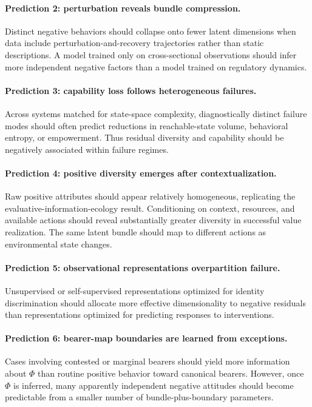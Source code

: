 \documentclass[11pt]{article}
\begin{document}
\paragraph{Prediction 2: perturbation reveals bundle compression.}
Distinct negative behaviors should collapse onto fewer latent dimensions when data include perturbation-and-recovery trajectories rather than static descriptions. A model trained only on cross-sectional observations should infer more independent negative factors than a model trained on regulatory dynamics.

\paragraph{Prediction 3: capability loss follows heterogeneous failures.}
Across systems matched for state-space complexity, diagnostically distinct failure modes should often predict reductions in reachable-state volume, behavioral entropy, or empowerment. Thus residual diversity and capability should be negatively associated within failure regimes.

\paragraph{Prediction 4: positive diversity emerges after contextualization.}
Raw positive attributes should appear relatively homogeneous, replicating the evaluative-information-ecology result. Conditioning on context, resources, and available actions should reveal substantially greater diversity in successful value realization. The same latent bundle should map to different actions as environmental state changes.

\paragraph{Prediction 5: observational representations overpartition failure.}
Unsupervised or self-supervised representations optimized for identity discrimination should allocate more effective dimensionality to negative residuals than representations optimized for predicting responses to interventions.

\paragraph{Prediction 6: bearer-map boundaries are learned from exceptions.}
Cases involving contested or marginal bearers should yield more information about $\Phi$ than routine positive behavior toward canonical bearers. However, once $\Phi$ is inferred, many apparently independent negative attitudes should become predictable from a smaller number of bundle-plus-boundary parameters.
\end{document}
